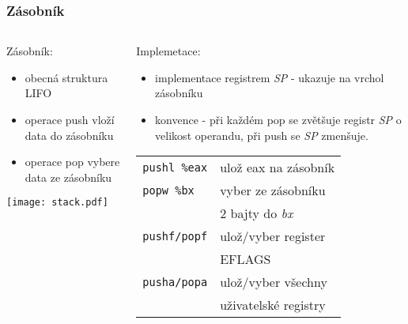 \documentclass{beamer}
\begin{document}
\begin{frame}
\frametitle{Zásobník}

\begin{columns}
\begin{column}{0.45\textwidth}
Zásobník:
\begin{itemize}
\item obecná struktura LIFO
\item operace push vloží data do zásobníku
\item operace pop vybere data ze zásobníku
\end{itemize}
\begin{center}
   \texttt{[image: stack.pdf]}
\end{center}

\end{column}

\begin{column}{0.55\textwidth}  
Implemetace:
\begin{itemize}
\item implementace registrem \textit{SP} - ukazuje na vrchol zásobníku
\item konvence - při každém pop se zvětšuje registr \textit{SP} o velikost operandu, při push se \textit{SP} zmenšuje.
\end{itemize}
\begin{tabular}{ l l}
\texttt{pushl \%eax} &  ulož eax na zásobník\\
\texttt{popw \%bx}   &  vyber ze zásobníku \\
                     &  2 bajty do \textit{bx}\\
\texttt{pushf/popf}  &  ulož/vyber register\\
                     &  EFLAGS\\
\texttt{pusha/popa}  &  ulož/vyber všechny\\
                     &  uživatelské registry\\
\end{tabular}
\end{column}
\end{columns}
\end{frame}
\end{document}
